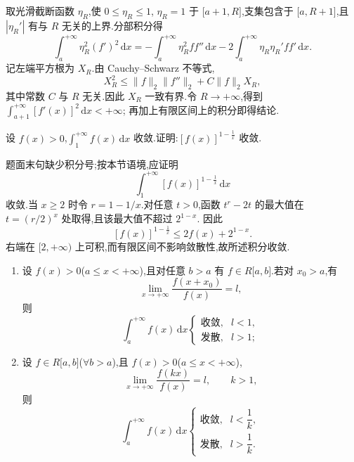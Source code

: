 \begin{solution}
  取光滑截断函数 $\eta_R$,使 $0\leq\eta_R\leq1$,
  $\eta_R=1$ 于 $\lbrack a+1,R\rbrack$,支集包含于
  $\lbrack a,R+1\rbrack$,且 $|\eta_R'|$ 有与 $R$ 无关的上界.分部积分得
  \[
    \displaystyle\int_a^{+\infty}\eta_R^2(f')^2\,\mathrm{d}x
    =-\int_a^{+\infty}\eta_R^2ff''\,\mathrm{d}x
    -2\int_a^{+\infty}\eta_R\eta_R'ff'\,\mathrm{d}x.
  \]
  记左端平方根为 $X_R$.由 Cauchy--Schwarz 不等式,
  \[
    X_R^2
    \leq\|f\|_2\|f''\|_2+C\|f\|_2X_R,
  \]
  其中常数 $C$ 与 $R$ 无关.因此 $X_R$ 一致有界.令 $R\to+\infty$,得到
  $\displaystyle\int_{a+1}^{+\infty}[f'(x)]^2\,\mathrm{d}x<+\infty$;
  再加上有限区间上的积分即得结论.
\end{solution}

\begin{example}
  设 $f(x)>0$,$\displaystyle\int_1^{+\infty}f(x)\,\mathrm{d}x$ 收敛.证明:$[f(x)]^{1-\frac{1}{x}}$ 收敛.
\end{example}
\exampleblank

\begin{solution}
  题面末句缺少积分号;按本节语境,应证明
  \[
    \displaystyle\int_1^{+\infty}[f(x)]^{1-\frac{1}{x}}\,\mathrm{d}x
  \]
  收敛.当 $x\geq2$ 时令 $r=1-1/x$.对任意 $t>0$,函数
  $t^r-2t$ 的最大值在 $t=(r/2)^x$ 处取得,且该最大值不超过 $2^{1-x}$.
  因此
  \[
    [f(x)]^{1-\frac{1}{x}}\leq2f(x)+2^{1-x}.
  \]
  右端在 $\lbrack2,+\infty)$ 上可积,而有限区间不影响敛散性,故所述积分收敛.
\end{solution}

\begin{example}
  \begin{enumerate}
    \item 设 $f(x)>0$($a\leq x<+\infty$),且对任意 $b>a$ 有 $f\in R\lbrack a,b\rbrack$.若对 $x_0>a$,有
          \[
            \displaystyle\lim\limits_{x\to+\infty}\dfrac{f(x+x_0)}{f(x)}=l,
          \]
          则
          \[
            \displaystyle\int_a^{+\infty}f(x)\,\mathrm{d}x
            \begin{cases}
              \text{收敛}, & l<1, \\
              \text{发散}, & l>1;
            \end{cases}
          \]
    \item 设 $f\in R\lbrack a,b\rbrack$($\forall b>a$),且 $f(x)>0$($a\leq x<+\infty$),
          \[
            \displaystyle\lim\limits_{x\to+\infty}\dfrac{f(kx)}{f(x)}=l,
            \qquad k>1,
          \]
          则
          \[
            \displaystyle\int_a^{+\infty}f(x)\,\mathrm{d}x
            \begin{cases}
              \text{收敛}, & l<\dfrac{1}{k}, \\
              \text{发散}, & l>\dfrac{1}{k}.
            \end{cases}
          \]
  \end{enumerate}
\end{example}
\exampleblank

